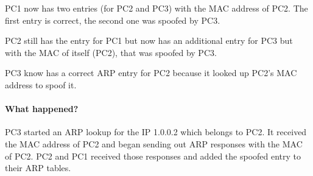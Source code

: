 \documentclass[12pt, a4paper]{article}
\begin{document}
\begin{enumerate}[a]
	PC1 now has two entries (for PC2 and PC3) with the MAC address of PC2. The first entry is correct, the second one was spoofed by PC3.

	PC2 still has the entry for PC1 but now has an additional entry for PC3 but with the MAC of itself (PC2), that was spoofed by PC3.

	PC3 know has a correct ARP entry for PC2 because it looked up PC2's MAC address to spoof it.

	\paragraph{What happened?}
	PC3 started an ARP lookup for the IP 1.0.0.2 which belongs to PC2. It received the MAC address of PC2 and began sending out ARP responses with the MAC of PC2. PC2 and PC1 received those responses and added the spoofed entry to their ARP tables.
\end{enumerate}
\end{document}
